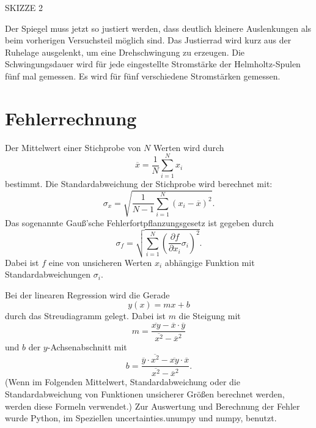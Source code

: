 \noindent SKIZZE 2

\noindent Der Spiegel muss jetzt so justiert werden, dass
deutlich kleinere Auslenkungen als beim
vorherigen Versuchsteil möglich sind. Das
Justierrad wird kurz aus der Ruhelage ausgelenkt,
um eine Drehschwingung zu erzeugen.
Die Schwingungsdauer wird für jede eingestellte
Stromstärke der Helmholtz-Spulen fünf mal
gemessen. Es wird für fünf verschiedene
Stromstärken gemessen.

\section{Fehlerrechnung}
Der Mittelwert einer Stichprobe von $N$ Werten
wird durch
\begin{equation*}
    \overline{x} = \frac{1}{N} \sum_{i=1}^N x_i
\end{equation*}
bestimmt.
Die Standardabweichung der Stichprobe wird berechnet mit:
\begin{equation*}
    \sigma_x = \sqrt{\frac{1}{N-1} \sum_{i=1}^N (x_i - \overline{x})^2}.
\end{equation*}
Das sogenannte Gauß'sche Fehlerfortpflanzungsgesetz
ist gegeben durch
\begin{equation*}
    \sigma_f = \sqrt{\sum_{i=1}^N (\frac{\partial f}{\partial x_i} \sigma_i)^2}.
\end{equation*}
Dabei ist $f$ eine von unsicheren Werten $x_i$
abhängige Funktion mit Standardabweichungen $\sigma_i$.

Bei der linearen Regression wird die Gerade
\begin{equation*}
    y(x) = mx + b
\end{equation*}
durch das Streudiagramm gelegt.
Dabei ist $m$ die Steigung mit
\begin{equation*}
    m = \frac{\overline{xy} - \overline{x} \cdot \overline{y}}{\overline{x^2} - \overline{x}^2}
\end{equation*}
und $b$ der $y$-Achsenabschnitt mit
\begin{equation*}
    b = \frac{\overline{y} \cdot \overline{x^2} - \overline{xy} \cdot \overline{x}}{\overline{x^2} - \overline{x}^2}.
\end{equation*}
(Wenn im Folgenden Mittelwert, Standardabweichung
oder die Standardabweichung von Funktionen unsicherer
Größen berechnet werden, werden diese Formeln
verwendet.)
Zur Auswertung und Berechnung der Fehler
wurde Python, im Speziellen uncertainties.unumpy
und numpy, benutzt.


